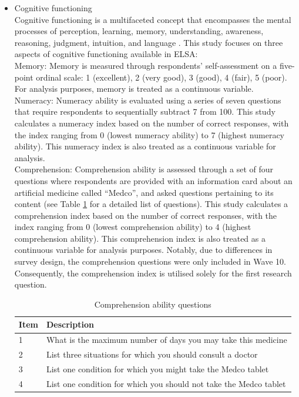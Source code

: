 \begin{itemize}[wide=0pt, leftmargin=*, labelwidth=0pt, labelindent=\parindent, itemindent=0pt]
    \item Cognitive functioning \\
    Cognitive functioning is a multifaceted concept that encompasses the mental processes of perception, learning, memory, understanding, awareness, reasoning, judgment, intuition, and language \parencite{americanpsychologicalassociation_cognitive_2018}. This study focuses on three aspects of cognitive functioning available in ELSA: \\
    Memory: Memory is measured through respondents' self-assessment on a five-point ordinal scale: 1 (excellent), 2 (very good), 3 (good), 4 (fair), 5 (poor). For analysis purposes, memory is treated as a continuous variable. \\
    Numeracy: Numeracy ability is evaluated using a series of seven questions that require respondents to sequentially subtract 7 from 100. This study calculates a numeracy index based on the number of correct responses, with the index ranging from 0 (lowest numeracy ability) to 7 (highest numeracy ability). This numeracy index is also treated as a continuous variable for analysis. \\
    Comprehension: Comprehension ability is assessed through a set of four questions where respondents are provided with an information card about an artificial medicine called ``Medco”, and asked questions pertaining to its content (see Table \ref{tab:comprehension} for a detailed list of questions). This study calculates a comprehension index based on the number of correct responses, with the index ranging from 0 (lowest comprehension ability) to 4 (highest comprehension ability). This comprehension index is also treated as a continuous variable for analysis purposes. Notably, due to differences in survey design, the comprehension questions were only included in Wave 10. Consequently, the comprehension index is utilised solely for the first research question.

    \begin{table}[h!]
        \centering
        \caption{Comprehension ability questions}
        \label{tab:comprehension}
        \begin{tabular}{ll}
            \toprule
            Item & Description \\
            \midrule
            1 & What is the maximum number of days you may take this medicine \\
            2 & List three situations for which you should consult a doctor \\
            3 & List one condition for which you might take the Medco tablet \\
            4 & List one condition for which you should not take the Medco tablet \\
            \bottomrule
        \end{tabular}
    \end{table}

\end{itemize}


